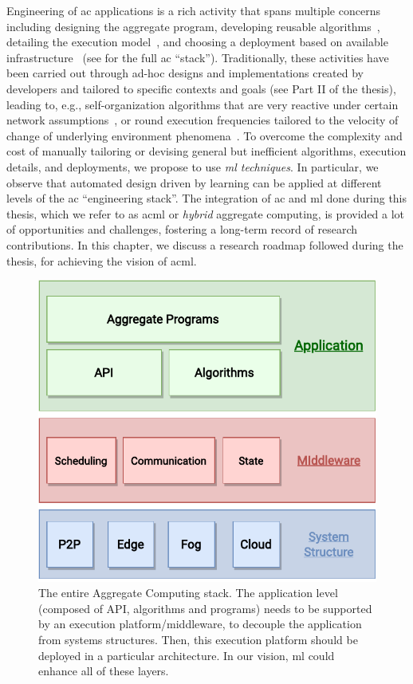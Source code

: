 Engineering of \ac{ac} applications 
 is a rich activity 
 that spans multiple concerns
 including
 designing the aggregate program,
 developing reusable algorithms~\cite{DBLP:conf/saso/AudritoCDV17,DBLP:journals/cee/AudritoCDPV21},  
 detailing the execution model~\cite{danilo2021lmcs},
 and choosing a deployment
 based on available infrastructure~\cite{DBLP:journals/fi/CasadeiPPVW20} (see  for the full \ac{ac} ``stack'').
%
Traditionally,
 these activities have been carried out 
 through ad-hoc designs and implementations
 created by developers
 and tailored to specific contexts and goals (see Part II of the thesis),
 leading to, e.g.,
 self-organization algorithms 
 that are very reactive under certain network assumptions~\cite{DBLP:journals/cee/AudritoCDPV21},
 or round execution frequencies tailored to the velocity of change of underlying environment phenomena~\cite{danilo2021lmcs}.
%
To overcome the complexity and cost 
 of manually tailoring or devising general but inefficient algorithms, execution details, 
 and deployments,
 we propose to use \emph{\ac{ml} techniques}.
%
In particular, we observe that 
 automated design
 driven by learning
 can be applied at different levels
 of the \ac{ac} ``engineering stack''.
%
The integration of \ac{ac} and \ac{ml} done during this thesis, 
 which we refer to as \ac{acml} or \emph{hybrid} aggregate computing,
 is provided a lot of opportunities and challenges, 
 fostering a long-term record of research contributions.
%
In this chapter, we discuss a research roadmap followed during the thesis,
 for achieving the vision of \ac{acml}.

\begin{figure}[h]
\centering
  \includegraphics[width=0.8\linewidth]{papers/discoli/img/ac-rl.pdf}
  \caption[The aggregate computing stack]{The entire Aggregate Computing stack. 
  The application level (composed of API, algorithms and programs) needs to be supported by an execution platform/middleware, 
  to decouple the application from systems structures. 
  Then, this execution platform should be deployed in a particular architecture. 
  In our vision, \acl{ml} could enhance all of these layers.
  }
  \label{fig:architectures}
\end{figure}

